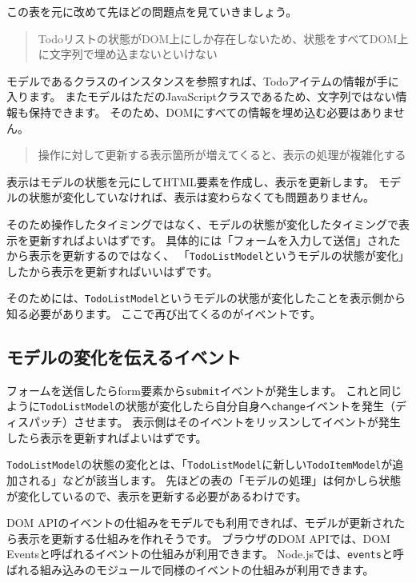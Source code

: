 この表を元に改めて先ほどの問題点を見ていきましょう。

\begin{quote}
Todoリストの状態がDOM上にしか存在しないため、状態をすべてDOM上に文字列で埋め込まないといけない
\end{quote}

モデルであるクラスのインスタンスを参照すれば、Todoアイテムの情報が手に入ります。
またモデルはただのJavaScriptクラスであるため、文字列ではない情報も保持できます。
そのため、DOMにすべての情報を埋め込む必要はありません。

\begin{quote}
操作に対して更新する表示箇所が増えてくると、表示の処理が複雑化する
\end{quote}

表示はモデルの状態を元にしてHTML要素を作成し、表示を更新します。
モデルの状態が変化していなければ、表示は変わらなくても問題ありません。

そのため操作したタイミングではなく、モデルの状態が変化したタイミングで表示を更新すればよいはずです。
具体的には「フォームを入力して送信」されたから表示を更新するのではなく、
「\texttt{TodoListModel}というモデルの状態が変化」したから表示を更新すればいいはずです。

そのためには、\texttt{TodoListModel}というモデルの状態が変化したことを表示側から知る必要があります。
ここで再び出てくるのがイベントです。

\hypertarget{model-and-event}{%
\subsection{モデルの変化を伝えるイベント}\label{model-and-event}}

フォームを送信したらform要素から\texttt{submit}イベントが発生します。
これと同じように\texttt{TodoListModel}の状態が変化したら自分自身へ\texttt{change}イベントを発生（ディスパッチ）させます。
表示側はそのイベントをリッスンしてイベントが発生したら表示を更新すればよいはずです。

\texttt{TodoListModel}の状態の変化とは、「\texttt{TodoListModel}に新しい\texttt{TodoItemModel}が追加される」などが該当します。
先ほどの表の「モデルの処理」は何かしら状態が変化しているので、表示を更新する必要があるわけです。

DOM
APIのイベントの仕組みをモデルでも利用できれば、モデルが更新されたら表示を更新する仕組みを作れそうです。
ブラウザのDOM APIでは、DOM
Eventsと呼ばれるイベントの仕組みが利用できます。
Node.jsでは、\texttt{events}と呼ばれる組み込みのモジュールで同様のイベントの仕組みが利用できます。

